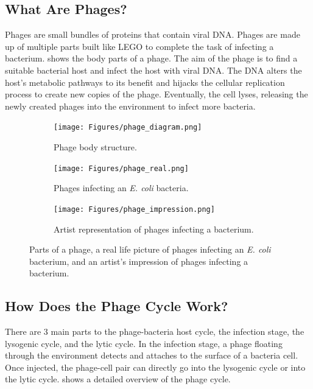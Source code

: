 \subsection{What Are Phages?}
Phages are small bundles of proteins that contain viral DNA. 
Phages are made up of multiple parts built like LEGO to complete the task of infecting a bacterium. 
 shows the body parts of a phage. 
The aim of the phage is to find a suitable bacterial host and infect the host with viral DNA. 
The DNA alters the host's metabolic pathways to its benefit and hijacks the cellular replication process to create new copies of the phage. 
Eventually, the cell lyses, releasing the newly created phages into the environment to infect more bacteria. 
\begin{figure}[h!]
    \centering
    \begin{subfigure}{0.25\linewidth}
        \centering
        \captionsetup{width=1\linewidth}
        \texttt{[image: Figures/phage\_diagram.png]}
        \caption{
            Phage body structure. 
        }
        \label{fig:figures:phage_diagram}
    \end{subfigure}
    \hfill
    \begin{subfigure}{0.3\linewidth}
        \centering
        \captionsetup{width=1\linewidth}
        \texttt{[image: Figures/phage\_real.png]}
        \caption{
            Phages infecting an \textit{E. coli} bacteria. 
        }
        \label{fig:figures:phage_real}
    \end{subfigure}
    \hfill
    \begin{subfigure}{0.35\linewidth}
        \centering
        \captionsetup{width=1\linewidth}
        \texttt{[image: Figures/phage\_impression.png]}
        \caption{
            Artist representation of phages infecting a bacterium. 
        }
        \label{fig:figures:phage_impression}
    \end{subfigure}
    \caption{Parts of a phage, a real life picture of phages infecting an \textit{E. coli} bacterium, and an artist's impression of phages infecting a bacterium. }
\end{figure}

\subsection{How Does the Phage Cycle Work?}
There are 3 main parts to the phage-bacteria host cycle, the infection stage, the lysogenic cycle, and the lytic cycle. 
In the infection stage, a phage floating through the environment detects and attaches to the surface of a bacteria cell. 
Once injected, the phage-cell pair can directly go into the lysogenic cycle or into the lytic cycle. 
 shows a detailed overview of the phage cycle. 
\newline 

